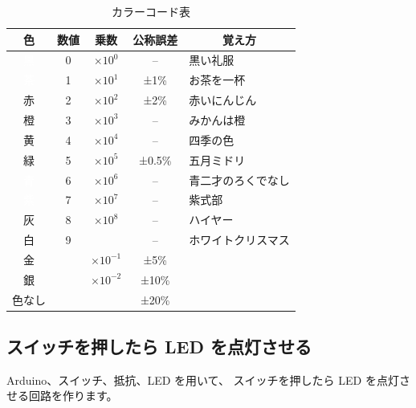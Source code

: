 \documentclass[11pt,a4paper]{jarticle}
\begin{document}
\begin{table}[htb]
 \begin{center}
  \caption{カラーコード表}
  \label{tb:colorCode}
  \begin{tabular}{|c|c|c|c|l|} \hline
   \hspace{1zw}色\hspace{1zw} & 数値 & 乗数 & 公称誤差 & \multicolumn{1}{c|}{覚え方} \\ \hline
   \cellcolor{black}\textcolor {white}{黒} & 0 & $×10^0$ & -- & 黒い礼服 \\ \hline
   \cellcolor{Brown}\textcolor {white}茶 & 1 & $×10^1$ & ±1\% & お茶を一杯 \\ \hline
   \cellcolor{red}赤 & 2 & $×10^2$ & ±2\% & 赤いにんじん \\ \hline
   \cellcolor[rgb]{1.0, 0.5, 0.0}橙 & 3 & $×10^3$ & -- & みかんは橙 \\ \hline
   \cellcolor{yellow}黄 & 4 & $×10^4$ & -- & 四季の色 \\ \hline
   \cellcolor{green}緑 & 5 & $×10^5$ & ±0.5\% & 五月ミドリ \\ \hline
   \cellcolor{blue}\textcolor {white}青 & 6 & $×10^6$ & -- & 青二才のろくでなし \\ \hline
   \cellcolor[rgb]{0.5, 0.0, 0.5}\textcolor {white}紫 & 7 & $×10^7$ & -- & 紫式部 \\ \hline
   \cellcolor[rgb]{0.5, 0.5, 0.5}灰 & 8 & $×10^8$ & -- & ハイヤー \\ \hline
   \cellcolor{white}白 & 9 &  & -- & ホワイトクリスマス \\ \hline
   \cellcolor[rgb]{0.83, 0.69, 0.22}金 &  & $×10^{-1}$ & ±5\% & \\ \hline
   \cellcolor[rgb]{0.75, 0.75, 0.75}銀 &   & $×10^{-2}$ & ±10\% & \\ \hline
   \cellcolor[rgb]{0.96, 0.96, 0.86}色なし &   &   & ±20\% & \\ \hline
  \end{tabular}
 \end{center}
\end{table}

\subsection*{スイッチを押したら LED を点灯させる}
Arduino、スイッチ、抵抗、LED を用いて、
スイッチを押したら LED を点灯させる回路を作ります。
\end{document}
